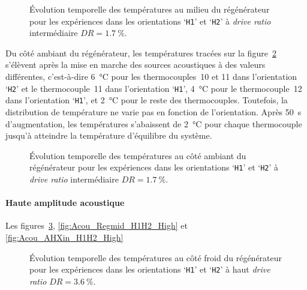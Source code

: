 \begin{figure}[!ht]
    \centering
    
    \caption{\'Evolution temporelle des températures au milieu du régénérateur pour les expériences dans les orientations `\texttt{H1}' et `\texttt{H2}' à \textit{drive ratio} intermédiaire $DR=\qty{1.7}{\percent}$.}
    \label{fig:Acou_Regmid_H1H2_Mid}
\end{figure}

Du côté ambiant du régénérateur, les températures tracées sur la figure~\ref{fig:Acou_AHXin_H1H2_Mid} s'élèvent après la mise en marche des sources acoustiques à des valeurs différentes, c'est-à-dire \qty{6}{\degreeCelsius} pour les thermocouples~10 et 11 dans l'orientation `\texttt{H2}' et le thermocouple~11 dans l'orientation `\texttt{H1}', \qty{4}{\degreeCelsius} pour le thermocouple~12 dans l'orientation `\texttt{H1}', et \qty{2}{\degreeCelsius} pour le reste des thermocouples. Toutefois, la distribution de température ne varie pas en fonction de l'orientation. Après \qty{50}{\second} d'augmentation, les températures s'abaissent de \qty{2}{\degreeCelsius} pour chaque thermocouple jusqu'à atteindre la température d'équilibre du système.

\begin{figure}[!ht]
    \centering
    
    \caption{\'Evolution temporelle des températures au côté ambiant du régénérateur pour les expériences dans les orientations `\texttt{H1}' et `\texttt{H2}' à \textit{drive ratio} intermédiaire $DR=\qty{1.7}{\percent}$.}
    \label{fig:Acou_AHXin_H1H2_Mid}
\end{figure}


\paragraph{Haute amplitude acoustique}
Les figures~\ref{fig:Acou_CHXin_H1H2_High}, \ref{fig:Acou_Regmid_H1H2_High} et \ref{fig:Acou_AHXin_H1H2_High}

\begin{figure}[!ht]
    \centering
    
    \caption{\'Evolution temporelle des températures au côté froid du régénérateur pour les expériences dans les orientations `\texttt{H1}' et `\texttt{H2}' à haut \textit{drive ratio} $DR=\qty{3.6}{\percent}$.}
    \label{fig:Acou_CHXin_H1H2_High}
\end{figure}

